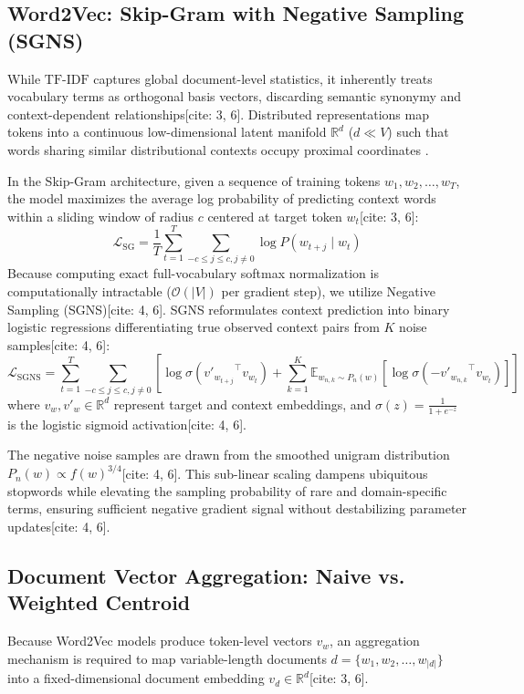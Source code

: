 \documentclass[11pt,a4paper]{article}
\begin{document}
	\subsection{Word2Vec: Skip-Gram with Negative Sampling (SGNS)}
	While $\text{TF-IDF}$ captures global document-level statistics, it inherently treats vocabulary terms as orthogonal basis vectors, discarding semantic synonymy and context-dependent relationships[cite: 3, 6]. Distributed representations map tokens into a continuous low-dimensional latent manifold $\mathbb{R}^d$ ($d \ll V$) such that words sharing similar distributional contexts occupy proximal coordinates \cite{mikolov2013distributed}.
	
	In the Skip-Gram architecture, given a sequence of training tokens $w_1, w_2, \dots, w_T$, the model maximizes the average log probability of predicting context words within a sliding window of radius $c$ centered at target token $w_t$[cite: 3, 6]:
	\begin{equation}
		\mathcal{L}_{\text{SG}} = \frac{1}{T} \sum_{t=1}^{T} \sum_{-c \le j \le c, j \ne 0} \log P(w_{t+j} \mid w_t)
		\label{eq:sg_obj}
	\end{equation}
	Because computing exact full-vocabulary softmax normalization is computationally intractable ($\mathcal{O}(|V|)$ per gradient step), we utilize Negative Sampling (SGNS)[cite: 4, 6]. SGNS reformulates context prediction into binary logistic regressions differentiating true observed context pairs from $K$ noise samples[cite: 4, 6]:
	\begin{equation}
		\mathcal{L}_{\text{SGNS}} = \sum_{t=1}^{T} \sum_{-c \le j \le c, j \ne 0} \left[ \log \sigma\left({v'_{w_{t+j}}}^\top v_{w_t}\right) + \sum_{k=1}^{K} \mathbb{E}_{w_{n,k} \sim P_n(w)} \left[ \log \sigma\left(-{v'_{w_{n,k}}}^\top v_{w_t}\right) \right] \right]
		\label{eq:sgns_loss}
	\end{equation}
	where $v_w, v'_w \in \mathbb{R}^d$ represent target and context embeddings, and $\sigma(z) = \frac{1}{1 + e^{-z}}$ is the logistic sigmoid activation[cite: 4, 6].
	
	The negative noise samples are drawn from the smoothed unigram distribution $P_n(w) \propto f(w)^{3/4}$[cite: 4, 6]. This sub-linear scaling dampens ubiquitous stopwords while elevating the sampling probability of rare and domain-specific terms, ensuring sufficient negative gradient signal without destabilizing parameter updates[cite: 4, 6].
	
	\subsection{Document Vector Aggregation: Naive vs. Weighted Centroid}
	Because Word2Vec models produce token-level vectors $v_w$, an aggregation mechanism is required to map variable-length documents $d = \{w_1, w_2, \dots, w_{|d|}\}$ into a fixed-dimensional document embedding $v_d \in \mathbb{R}^d$[cite: 3, 6].
	
\end{document}
